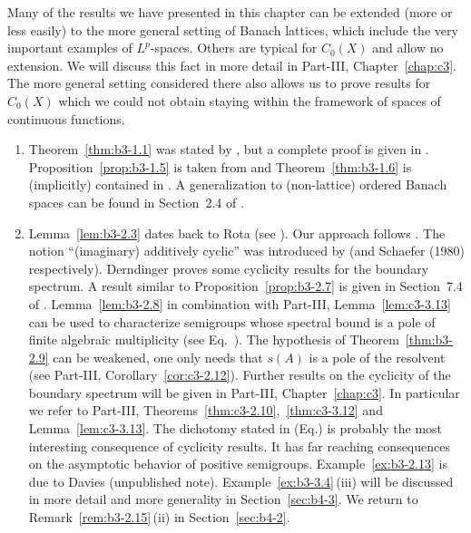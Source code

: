 Many of the results we have presented in this chapter can be extended (more or less easily) to the more general setting of Banach lattices, which include the very important examples of\/ $L^p$-spaces.
Others are typical for $C_{0}(X)$ and allow no extension.
We will discuss this fact in more detail in Part-III, Chapter~\ref{chap:c3}.
The more general setting considered there also allows us to prove results for $C_{0}(X)$ which we could not obtain staying within the framework of spaces of continuous functions.
\begin{enumerate}[label=\emph{Section \arabic*:}, wide]

\item
Theorem~\ref{thm:b3-1.1} was stated by \textcite{karlin:1959}, but a complete proof is given in \textcite{derndinger:1980}.
Proposition~\ref{prop:b3-1.5}  is taken from \textcite{greiner:1982} and Theorem~\ref{thm:b3-1.6} is (implicitly) contained in \textcite{derndingernagel:1979}.
A generalization to (non-lattice) ordered Banach spaces can be found in Section~2.4 of \textcite{battyrobinson:1984}.

\item
Lemma~\ref{lem:b3-2.3} dates back to Rota (see \textcite{schaefer:1974}).
Our approach follows \textcite{greiner:1981}.
The notion \enquote{(imaginary) additively cyclic} was introduced by \textcite{derndinger:1980} (and {Schaefer (1980)} respectively).
Derndinger proves some cyclicity results for the boundary spectrum.
A result similar to Proposition~\ref{prop:b3-2.7} is given in Section~7.4 of \textcite{davies:1980}.
Lemma~\ref{lem:b3-2.8} in combination with Part-III, Lemma~\ref{lem:c3-3.13}  can be used to characterize semigroups whose spectral bound is a pole of finite algebraic multiplicity (see Eq.~).
The hypothesis of Theorem~\ref{thm:b3-2.9} can be weakened, one only needs that $s(A)$ is a pole of the resolvent (see Part-III, Corollary~\ref{cor:c3-2.12}).
Further results on the cyclicity of the boundary spectrum will be given in Part-III, Chapter~\ref{chap:c3}.
In particular we refer to Part-III, Theorems~\ref{thm:c3-2.10},~\ref{thm:c3-3.12} and Lemma~\ref{lem:c3-3.13}.
The dichotomy stated in (Eq.)  is probably the most interesting consequence of cyclicity results.
It has far reaching consequences on the asymptotic behavior of positive semigroups.
Example~\ref{ex:b3-2.13} is due to Davies (unpublished note).
Example~\ref{ex:b3-3.4}\,(iii) will be discussed in more detail and more generality in Section~\ref{sec:b4-3}.
We return to Remark~\ref{rem:b3-2.15}\,(ii) in Section~\ref{sec:b4-2}.


\end{enumerate}
